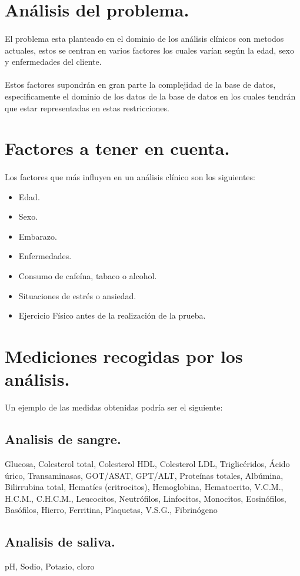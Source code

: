 \documentclass[a4paper,10pt]{article}
\begin{document}
\section{Análisis del problema.}
\paragraph{}
El problema esta planteado en el dominio de los análisis clínicos con metodos actuales, estos se centran en varios factores los cuales varían según la edad, sexo y enfermedades del cliente.
\paragraph{}
Estos factores supondrán en gran parte la complejidad de la base de datos, especificamente el dominio de los datos de la base de datos en los cuales tendrán que estar representadas en estas restricciones.
\section{Factores a tener en cuenta.}
\label{section:factoresatenerencuenta}
\paragraph{}
Los factores que más influyen en un análisis clínico son los siguientes:
\begin{itemize}
	\item Edad.
	\item Sexo.
	\item Embarazo.
	\item Enfermedades.
	\item Consumo de cafeína, tabaco o alcohol.
	\item Situaciones de estrés o ansiedad.
	\item Ejercicio Físico antes de la realización de la prueba.
\end{itemize}

\section{Mediciones recogidas por los análisis.}
Un ejemplo de las medidas obtenidas podría ser el siguiente:
\subsection{Analisis de sangre.}
Glucosa, Colesterol total, Colesterol HDL, Colesterol LDL, Triglicéridos, Ácido úrico, Transaminasas, GOT/ASAT, GPT/ALT, Proteínas totales, Albúmina, Bilirrubina total, Hematíes (eritrocitos), Hemoglobina, Hematocrito, V.C.M., H.C.M., C.H.C.M., Leucocitos, Neutrófilos, Linfocitos, Monocitos, Eosinófilos, Basófilos, Hierro, Ferritina, Plaquetas, V.S.G., Fibrinógeno \subsection{Analisis de saliva.}
pH, Sodio, Potasio, cloro
\end{document}
